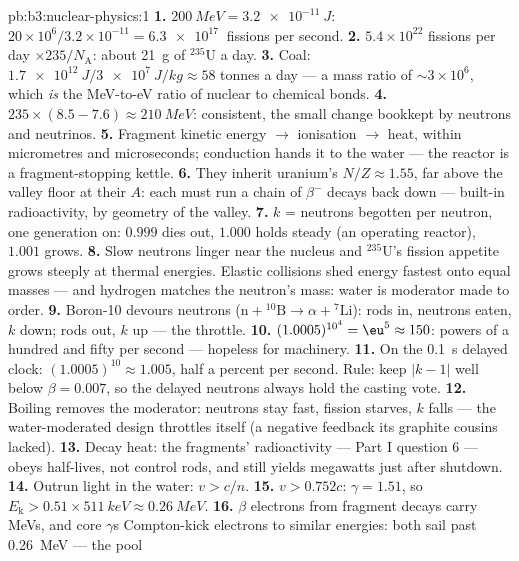 \begin{solution}{pb:b3:nuclear-physics:1}
\textbf{1.} $\qty{200}{MeV} = \qty{3.2e-11}{J}$:
$20\times10^6/3.2\times10^{-11} = \qty{6.3e17}{}$ fissions per
second.
\textbf{2.} $5.4\times10^{22}$ fissions per day $\times
235/N_{\text{A}}$: about \qty{21}{g} of $^{235}$U a day.
\textbf{3.} Coal: $\qty{1.7e12}{J}/\qty{3e7}{J/kg} \approx 58$
tonnes a day --- a mass ratio of $\sim3\times10^{6}$, which
\emph{is} the \unit{MeV}-to-\unit{eV} ratio of nuclear to
chemical bonds.
\textbf{4.} $235\times(8.5 - 7.6) \approx \qty{210}{MeV}$:
consistent, the small change bookkept by neutrons and
neutrinos.
\textbf{5.} Fragment kinetic energy $\to$ ionisation $\to$ heat,
within micrometres and microseconds; conduction hands it to the
water --- the reactor is a fragment-stopping kettle.
\textbf{6.} They inherit uranium's $N/Z \approx 1.55$, far
above the valley floor at their $A$: each must run a chain of
$\beta^-$ decays back down --- built-in radioactivity, by
geometry of the valley.
\textbf{7.} $k$ = neutrons begotten per neutron, one generation
on: $0.999$ dies out, $1.000$ holds steady (an operating
reactor), $1.001$ grows.
\textbf{8.} Slow neutrons linger near the nucleus and
$^{235}$U's fission appetite grows steeply at thermal energies.
Elastic collisions shed energy fastest onto equal masses ---
and hydrogen matches the neutron's mass: water is moderator
made to order.
\textbf{9.} Boron-10 devours neutrons ($\text{n} + {}^{10}
\text{B} \to \alpha + {}^{7}\text{Li}$): rods in, neutrons
eaten, $k$ down; rods out, $k$ up --- the throttle.
\textbf{10.} $(1.0005)^{10^4} = \eu^{5} \approx 150$: powers of
a hundred and fifty per second --- hopeless for machinery.
\textbf{11.} On the \qty{0.1}{s} delayed clock:
$(1.0005)^{10} \approx 1.005$, half a percent per second. Rule:
keep $|k - 1|$ well below $\beta = 0.007$, so the delayed
neutrons always hold the casting vote.
\textbf{12.} Boiling removes the moderator: neutrons stay fast,
fission starves, $k$ falls --- the water-moderated design
throttles itself (a negative feedback its graphite cousins
lacked).
\textbf{13.} Decay heat: the fragments' radioactivity ---
Part I question 6 --- obeys half-lives, not control rods, and
still yields megawatts just after shutdown.
\textbf{14.} Outrun light in the water: $v > c/n$.
\textbf{15.} $v > 0.752c$: $\gamma = 1.51$, so $E_{\text{k}} >
0.51\times\qty{511}{keV} \approx \qty{0.26}{MeV}$.
\textbf{16.} $\beta$ electrons from fragment decays carry
\unit{MeV}s, and core $\gamma$s Compton-kick electrons to
similar energies: both sail past \qty{0.26}{MeV} --- the pool

\end{solution}
